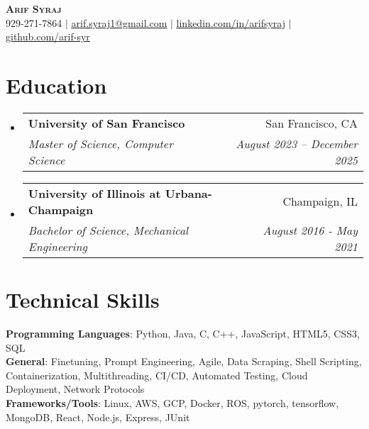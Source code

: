 \documentclass[letterpaper,11pt]{article}
\makeatletter
\newcommand{\resumeSubheading}[4]{
  \vspace{-3pt}\item
    \begin{tabular*}{0.97\textwidth}[t]{l@{\extracolsep{\fill}}r}
      \textbf{#1} & #2 \\
      \textit{\small#3} & \textit{\small #4} \\
    \end{tabular*}\vspace{-7pt}
}
\newcommand{\resumeSubHeadingListStart}
{\begin{itemize}[leftmargin=0.05in, label={}]}
\newcommand{\resumeSubHeadingListEnd}{\end{itemize}}
\makeatother
\begin{document}

\begin{center}
  \textbf{\Huge \scshape Arif Syraj} \\ \vspace{1pt}
  \small 929-271-7864 $|$ \href{mailto:arif.syraj1@gmail.com}{\underline{arif.syraj1@gmail.com}} $|$
  \href{https://linkedin.com/in/arifsyraj}{\underline{linkedin.com/in/arifsyraj}} $|$
  \href{https://github.com/arif-syr}{\underline{github.com/arif-syr}}
\end{center}


\section{Education}
\resumeSubHeadingListStart
\resumeSubheading
{University of San Francisco}{San Francisco, CA}
{Master of Science, Computer Science}{August 2023 -- December 2025}

\resumeSubheading
{University of Illinois at Urbana-Champaign}{Champaign, IL}
{Bachelor of Science, Mechanical Engineering}{August 2016 - May 2021}

\resumeSubHeadingListEnd

\section{Technical Skills}
\begin{itemize}[leftmargin=0.15in, label={}]
  \small{\item{
        \textbf{Programming Languages}{: Python, Java, C, C++, JavaScript, HTML5, CSS3, SQL} \\
        \textbf{General}{: Finetuning, Prompt Engineering, Agile, Data Scraping, Shell Scripting, Containerization, Multithreading, CI/CD, Automated Testing, Cloud Deployment, Network Protocols} \\
        \textbf{Frameworks/Tools}{: Linux, AWS, GCP, Docker, ROS, pytorch, tensorflow, MongoDB, React, Node.js, Express, JUnit}
        }}
\end{itemize}
\end{document}
